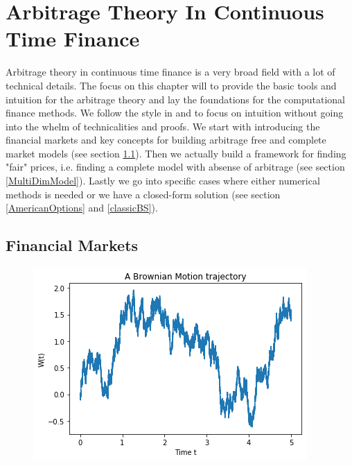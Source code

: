 
\chapter{Arbitrage Theory In Continuous Time Finance} %

\label{Chapter2} %

Arbitrage theory in continuous time finance is a very broad field with a lot of technical details. The focus on this chapter will to provide the basic tools and intuition for the arbitrage theory and lay the foundations for the computational finance methods. We follow the style in \parencite{Hull} and \parencite{finKont} to focus on intuition without going into the whelm of technicalities and proofs. We start with introducing the financial markets and key concepts for building arbitrage free and complete market models (see section \ref{FinMarket}). Then we actually build a framework for finding "fair" prices, i.e. finding a complete model with absense of arbitrage (see section \ref{MultiDimModel}). Lastly we go into specific cases where either numerical methods is needed or we have a closed-form solution (see section \ref{AmericanOptions} and \ref{classicBS}).


\section{Financial Markets}\label{FinMarket}

\begin{figure}[th]
\centering
\includegraphics{Figures/brownianMotion.png}
\decoRule
\caption[A Wiener process trajectory]{}
\label{fig:BM}
\end{figure}


